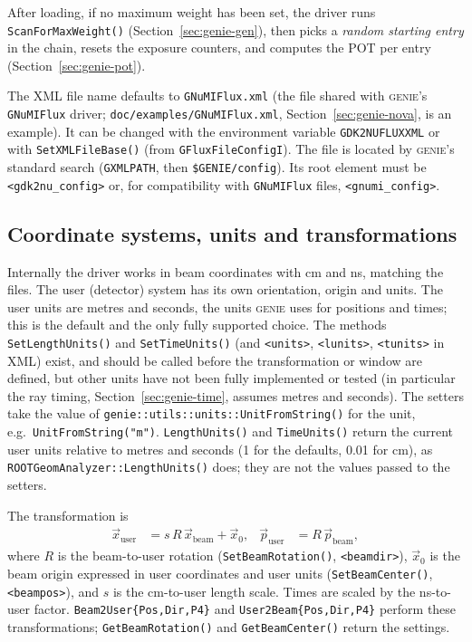 \documentclass[11pt]{article}
\newcommand{\code}[1]{\texttt{#1}}
\newcommand{\genie}{\textsc{genie}\xspace}
\newcommand{\sect}[1]{Section~\ref{sec:#1}}
\begin{document}
After loading, if no maximum weight has been set, the driver runs
\code{ScanForMaxWeight()} (\sect{genie-gen}), then picks a \emph{random
starting entry} in the chain, resets the exposure counters, and computes
the POT per entry (\sect{genie-pot}).

The XML file name defaults to \code{GNuMIFlux.xml} (the file shared with
\genie's \code{GNuMIFlux} driver; \code{doc/examples/GNuMIFlux.xml},
\sect{genie-nova}, is an example).  It can be changed with the
environment variable \code{GDK2NUFLUXXML} or with
\code{SetXMLFileBase()} (from \code{GFluxFileConfigI}).  The file is
located by \genie's standard search (\code{GXMLPATH}, then
\code{\$GENIE/config}).  Its root element must be \code{<gdk2nu\_config>}
or, for compatibility with \code{GNuMIFlux} files,
\code{<gnumi\_config>}.

\subsection{Coordinate systems, units and transformations}\label{sec:genie-coords}

Internally the driver works in beam coordinates with cm and ns, matching
the files.  The user (detector) system has its own orientation, origin and
units.  The user units are metres and seconds, the units \genie uses for
positions and times; this is the default and the only fully supported
choice.  The methods \code{SetLengthUnits()} and \code{SetTimeUnits()}
(and \code{<units>}, \code{<lunits>}, \code{<tunits>} in XML) exist, and
should be called before the transformation or window are defined, but
other units have not been fully implemented or tested (in particular the
ray timing, \sect{genie-time}, assumes metres and seconds).
The setters take the value of \code{genie::utils::units::UnitFromString()}
for the unit, e.g.\ \code{UnitFromString("m")}.  \code{LengthUnits()} and
\code{TimeUnits()} return the current user units relative to metres and
seconds (1 for the defaults, 0.01 for cm), as
\code{ROOTGeomAnalyzer::LengthUnits()} does; they are not the values passed
to the setters.

The transformation is
\begin{align}
  \vec x_\text{user} &= s\,R\,\vec x_\text{beam} + \vec x_0, &
  \vec p_\text{user} &= R\,\vec p_\text{beam},
\end{align}
where $R$ is the beam-to-user rotation (\code{SetBeamRotation()},
\code{<beamdir>}), $\vec x_0$ is the beam origin expressed in user
coordinates and user units (\code{SetBeamCenter()}, \code{<beampos>}),
and $s$ is the cm-to-user length scale.  Times are scaled by the
ns-to-user factor.  \code{Beam2User\{Pos,Dir,P4\}} and
\code{User2Beam\{Pos,Dir,P4\}} perform these transformations;
\code{GetBeamRotation()} and \code{GetBeamCenter()} return the settings.
\end{document}
